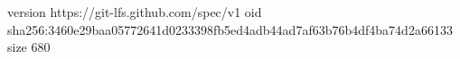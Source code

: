 version https://git-lfs.github.com/spec/v1
oid sha256:3460e29baa05772641d0233398fb5ed4adb44ad7af63b76b4df4ba74d2a66133
size 680
